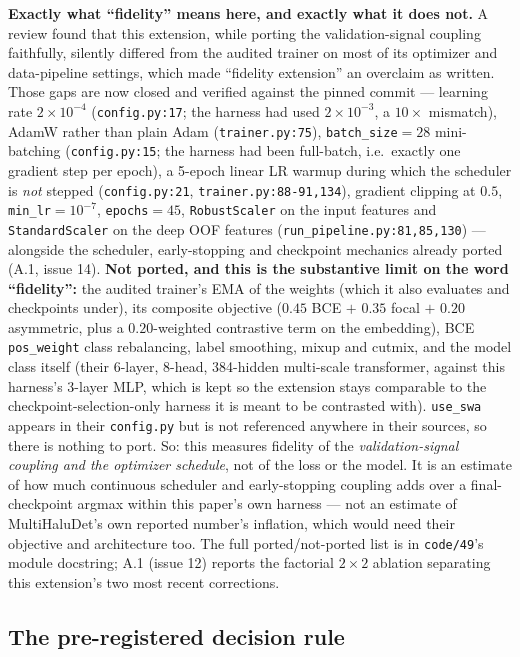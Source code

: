 \documentclass[10pt]{article} %
\begin{document}
\textbf{Exactly what ``fidelity'' means here, and exactly what it does not.} A
review found that this extension, while porting the validation-signal coupling
faithfully, silently differed from the audited trainer on most of its optimizer
and data-pipeline settings, which made ``fidelity extension'' an overclaim as
written. Those gaps are now closed and verified against the pinned commit ---
learning rate $2\times10^{-4}$ (\texttt{config.py:17}; the harness had used
$2\times10^{-3}$, a $10\times$ mismatch), AdamW rather than plain Adam
(\texttt{trainer.py:75}), \texttt{batch\_size}$=28$ mini-batching
(\texttt{config.py:15}; the harness had been full-batch, i.e.\ exactly one
gradient step per epoch), a 5-epoch linear LR warmup during which the scheduler
is \emph{not} stepped (\texttt{config.py:21},
\texttt{trainer.py:88-91,134}), gradient clipping at $0.5$,
\texttt{min\_lr}$=10^{-7}$, \texttt{epochs}$=45$, \texttt{RobustScaler} on the
input features and \texttt{StandardScaler} on the deep OOF features
(\texttt{run\_pipeline.py:81,85,130}) --- alongside the scheduler,
early-stopping and checkpoint mechanics already ported (A.1, issue 14).
\textbf{Not ported, and this is the substantive limit on the word
``fidelity'':} the audited trainer's EMA of the weights (which it also
evaluates and checkpoints under), its composite objective ($0.45$ BCE ${+}$
$0.35$ focal ${+}$ $0.20$ asymmetric, plus a $0.20$-weighted contrastive term
on the embedding), BCE \texttt{pos\_weight} class rebalancing, label smoothing,
mixup and cutmix, and the model class itself (their 6-layer, 8-head,
384-hidden multi-scale transformer, against this harness's 3-layer MLP, which
is kept so the extension stays comparable to the checkpoint-selection-only
harness it is meant to be contrasted with). \texttt{use\_swa} appears in their
\texttt{config.py} but is not referenced anywhere in their sources, so there is
nothing to port. So: this measures fidelity of the \emph{validation-signal
coupling and the optimizer schedule}, not of the loss or the model. It is an
estimate of how much continuous scheduler and early-stopping coupling adds over
a final-checkpoint argmax within this paper's own harness --- not an estimate
of MultiHaluDet's own reported number's inflation, which would need their
objective and architecture too. The full ported/not-ported list is in
\texttt{code/49}'s module docstring; A.1 (issue 12) reports the factorial $2\times2$ ablation separating this extension's two most recent
corrections.

\subsection{The pre-registered decision rule}
\end{document}
